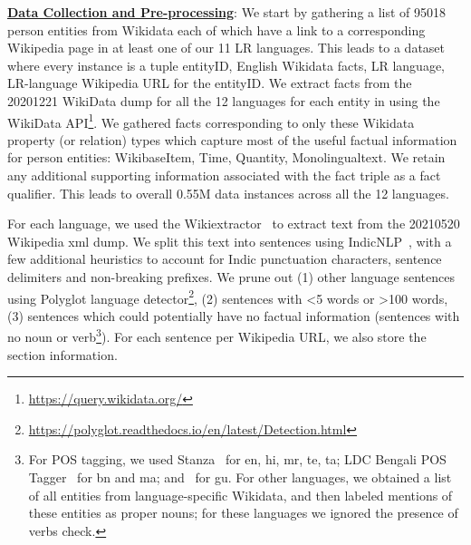 \documentclass[runningheads]{llncs}
\begin{document}
\noindent\underline{\textbf{Data Collection and Pre-processing}}: 
We start by gathering a list of 95018 person entities from Wikidata each of which have a link to a corresponding Wikipedia page in at least one of our 11 LR languages. This leads to a dataset  where every instance  is a tuple entityID, English Wikidata facts, LR language, LR-language Wikipedia URL for the entityID.
We extract facts from the 20201221 WikiData dump for all the 12 languages for each entity in  using the WikiData API\footnote{\url{https://query.wikidata.org/}}. We gathered facts corresponding to only these Wikidata property (or relation) types which capture most of the useful factual information for person entities: WikibaseItem, Time, Quantity, Monolingualtext. We retain any additional supporting information associated with the fact triple as a fact qualifier. This leads to overall 0.55M data instances across all the 12 languages. 

For each language, we used the Wikiextractor~\cite{Wikiextractor2015} to extract text from the 20210520 Wikipedia xml dump. We split this text into sentences using IndicNLP~\cite{kakwani2020indicnlpsuite}, with a few additional heuristics to account for Indic punctuation characters, sentence delimiters and non-breaking prefixes. We prune out (1) other language sentences using Polyglot language detector\footnote{\url{https://polyglot.readthedocs.io/en/latest/Detection.html}}, (2) sentences with <5 words or >100 words, (3) sentences which could potentially have no factual information (sentences with no noun or verb\footnote{For POS tagging, we used Stanza~\cite{qi2020stanza} for en, hi, mr, te, ta; LDC Bengali POS Tagger~\cite{bali2010indian} for bn and ma; and~\cite{patel2008part} for gu. For other languages, we obtained a list of all entities from language-specific Wikidata, and then labeled mentions of these entities as proper nouns; for these languages we ignored the presence of verbs check.}). For each sentence per Wikipedia URL, we also store the section information.
\end{document}
